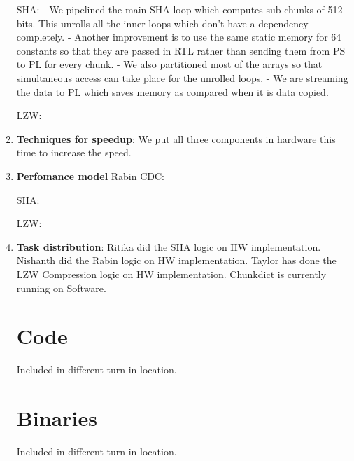 \documentclass{article}
\begin{document}
\begin{enumerate}
SHA: 
- We pipelined the main SHA loop which computes sub-chunks of 512 bits. This unrolls all the inner loops which don't have a dependency completely. 
- Another improvement is to use the same static memory for 64 constants so that they are passed in RTL rather than sending them from PS to PL for every chunk.
- We also partitioned most of the arrays so that simultaneous access can take place for the unrolled loops. 
- We are streaming the data to PL which saves memory as compared when it is data copied. 

LZW:
\newline

\item%
\textbf{Techniques for speedup}: We put all three components in hardware this time to increase the speed. 
\newline


\item%
\textbf{Perfomance model}
Rabin CDC:


SHA:


LZW:
\newline


\item%
\textbf{Task distribution}: 
Ritika did the SHA logic on HW implementation. 
Nishanth did the Rabin logic on HW implementation.
Taylor has done the LZW Compression logic on HW implementation.
Chunkdict is currently running on Software. 
\newline

\section{Code}

Included in different turn-in location.

\section{Binaries}

Included in different turn-in location.


\begin{appendices}
%
%
%


\end{appendices}




\end{enumerate}
\end{document}
